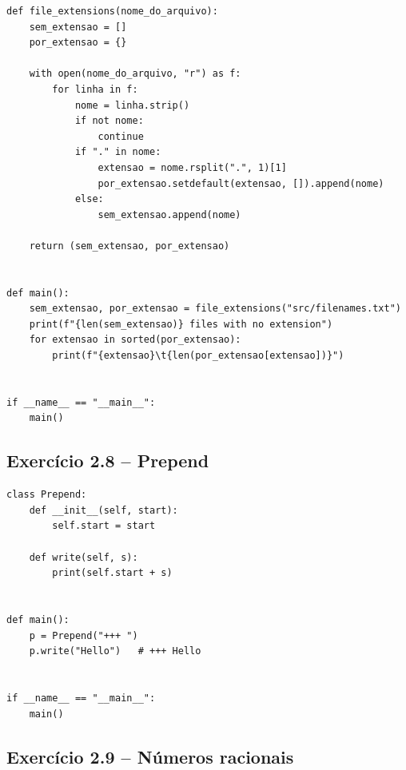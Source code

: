 \documentclass[11pt,a4paper]{article}
\begin{document}
\begin{solucao}
\begin{lstlisting}
def file_extensions(nome_do_arquivo):
    sem_extensao = []
    por_extensao = {}

    with open(nome_do_arquivo, "r") as f:
        for linha in f:
            nome = linha.strip()
            if not nome:
                continue
            if "." in nome:
                extensao = nome.rsplit(".", 1)[1]
                por_extensao.setdefault(extensao, []).append(nome)
            else:
                sem_extensao.append(nome)

    return (sem_extensao, por_extensao)


def main():
    sem_extensao, por_extensao = file_extensions("src/filenames.txt")
    print(f"{len(sem_extensao)} files with no extension")
    for extensao in sorted(por_extensao):
        print(f"{extensao}\t{len(por_extensao[extensao])}")


if __name__ == "__main__":
    main()
\end{lstlisting}
\end{solucao}

\subsection*{Exercício 2.8 -- Prepend}

\begin{solucao}
\begin{lstlisting}
class Prepend:
    def __init__(self, start):
        self.start = start

    def write(self, s):
        print(self.start + s)


def main():
    p = Prepend("+++ ")
    p.write("Hello")   # +++ Hello


if __name__ == "__main__":
    main()
\end{lstlisting}
\end{solucao}

\subsection*{Exercício 2.9 -- Números racionais}
\end{document}

